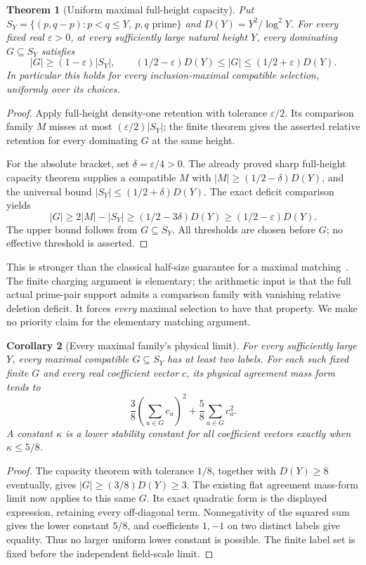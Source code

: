 \documentclass[11pt]{article}
\newtheorem{theorem}{Theorem}[section]
\newtheorem{corollary}[theorem]{Corollary}
\begin{document}
\begin{theorem}[Uniform maximal full-height capacity]
Put \(S_Y=\{(p,q-p):p<q\le Y,\ p,q\text{ prime}\}\) and
\(D(Y)=Y^2/\log^2Y\). For every fixed real \(\varepsilon>0\), at every
sufficiently large natural height \(Y\), \emph{every} dominating
\(G\subseteq S_Y\) satisfies
\[
 |G|\ge(1-\varepsilon)|S_Y|,\qquad
 (1/2-\varepsilon)D(Y)\le |G|\le(1/2+\varepsilon)D(Y).
\]
In particular this holds for every inclusion-maximal compatible selection,
uniformly over its choices.
\end{theorem}
\begin{proof}
Apply full-height density-one retention with tolerance \(\varepsilon/2\).
Its comparison family \(M\) misses at most
\((\varepsilon/2)|S_Y|\); the finite theorem gives the asserted relative
retention for every dominating \(G\) at the same height.

For the absolute bracket, set \(\delta=\varepsilon/4>0\). The already
proved sharp full-height capacity theorem supplies a compatible \(M\)
with \(|M|\ge(1/2-\delta)D(Y)\), and the universal bound
\(|S_Y|\le(1/2+\delta)D(Y)\). The exact deficit comparison yields
\[
 |G|\ge 2|M|-|S_Y|
       \ge(1/2-3\delta)D(Y)
       \ge(1/2-\varepsilon)D(Y).
\]
The upper bound follows from \(G\subseteq S_Y\).
All thresholds are chosen before \(G\); no effective threshold is asserted.
\end{proof}

This is stronger than the classical half-size guarantee for a maximal
matching~\cite{KarpVaziraniVazirani}. The finite charging argument is
elementary; the arithmetic input is that the full actual prime-pair
support admits a comparison family with vanishing relative deletion
deficit. It forces \emph{every} maximal selection to have that property.
We make no priority claim for the elementary matching argument.

\begin{corollary}[Every maximal family's physical limit]
For every sufficiently large \(Y\), every maximal compatible \(G\subseteq S_Y\)
has at least two labels. For each such fixed finite \(G\) and every real
coefficient vector \(c\), its physical agreement mass form tends to
\[
 \frac38\left(\sum_{a\in G}c_a\right)^2+
 \frac58\sum_{a\in G}c_a^2.
\]
A constant \(\kappa\) is a lower stability constant for all coefficient
vectors exactly when \(\kappa\le5/8\).
\end{corollary}
\begin{proof}
The capacity theorem with tolerance \(1/8\), together with \(D(Y)\ge8\)
eventually, gives \(|G|\ge(3/8)D(Y)\ge3\).
The existing flat agreement mass-form limit now applies to this same \(G\).
Its exact quadratic form is the displayed expression, retaining every
off-diagonal term. Nonnegativity of the squared sum gives the lower
constant \(5/8\), and coefficients \(1,-1\) on two distinct labels give
equality. Thus no larger uniform lower constant is possible.
The finite label set is fixed before the independent field-scale limit.
\end{proof}
\end{document}
